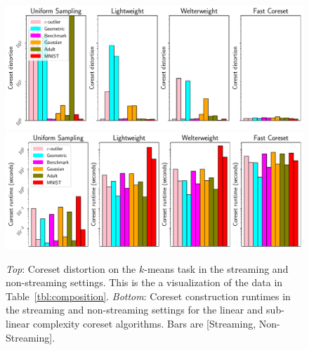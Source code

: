 \begin{figure}
    \centering
    \hspace*{0.1cm}\includegraphics[width=0.985\linewidth]{images/2/coreset_distortion-composition.pdf}
    \includegraphics[width=\linewidth]{images/2/coreset_runtime-composition.pdf}

    \caption{\emph{Top}: Coreset distortion on the $k$-means task in the streaming and non-streaming settings. This is the a visualization of the data in
    Table~\ref{tbl:composition}. \emph{Bottom}: Coreset construction runtimes in the streaming and non-streaming settings for the linear and sub-linear
    complexity coreset algorithms. Bars are [Streaming, Non-Streaming].}

    \label{fig:streaming_runtimes}
\end{figure}
